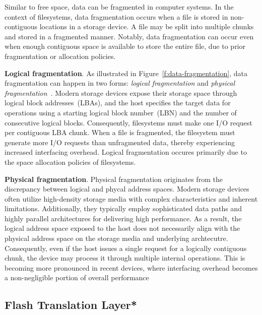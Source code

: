 Similar to free space, data can be fragmented in computer systems.
In the context of filesystems, data fragmentation occurs when a file is stored in non-contiguous locations in a storage device.
A file may be split into multiple chunks and stored in a fragmented manner.
Notably, data fragmentation can occur even when enough contiguous space is available to store the entire file, due to prior fragmentation or allocation policies.

\textbf{Logical fragmentation}.
As illustrated in Figure~\ref{f:data-fragmentation}, data fragmentation can happen in two forms: \emph{logical fragmentation} and \emph{physical fragmentation}~\cite{janusd:atc17}.
Modern storage devices expose their storage space through logical block addresses~(LBAs), and the host specifies the target data for operations using a starting logical block number~(LBN) and the number of consecutive logical blocks.
Consequently, filesystems must make one I/O request per contiguous LBA chunk.
When a file is fragmented, the filesystem must generate more I/O requests than unfragmented data, thereby experiencing increased interfacing overhead.
Logical fragmentation occures primarily due to the space allocation policies of filesystems.

\textbf{Physical fragmentation}.
Physical fragmentation originates from the discrepancy between logical and phycal address spaces.
Modern storage devices often utilize high-density storage media with complex characteristics and inherent limitations.
Additionally, they typically employ sophisticated data paths and highly parallel architectures for delivering high performance.
As a result, the logical address space exposed to the host does not necessarily align with the physical address space on the storage media and underlying archtecutre.
Consequently, even if the host issues a single request for a logically contiguous chunk, the device may process it through multiple internal operations.
This is becoming more pronounced in recent devices, where interfacing overhead becomes a non-negligible portion of overall performance~\cite{Problem_in_SSD_Empirical,senescence:fast17,Problem_in_SSD_Mobile_Devices,survey:ictc23,no-afraid:fast24,defrag-mobile:atc17,fragpicker:sosp21}

\subsection{Flash Translation Layer*}\label{ss:ftl}

